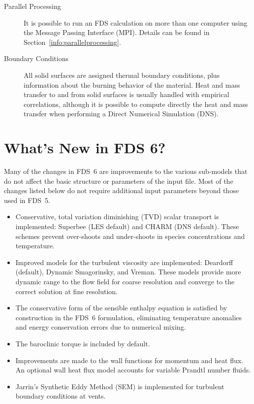 \documentclass[11pt]{book}
\begin{document}
\begin{description}
\item[Parallel Processing] It is possible to run an FDS calculation on
more than one computer using the Message Passing Interface (MPI). Details
can be found in Section~\ref{info:parallelprocessing}.

\item[Boundary Conditions]
All solid surfaces are assigned thermal boundary conditions, plus
information about the burning behavior of the material.
Heat and mass transfer to and from solid surfaces is
usually handled with empirical correlations, although it is possible
to compute directly the heat and mass transfer when performing a
Direct Numerical Simulation (DNS).

\end{description}


\section{What's New in FDS 6?}

Many of the changes in FDS~6 are improvements to the various sub-models that do not affect the basic structure or parameters of the input file. Most of the changes listed below do not require additional input parameters beyond those used in FDS~5.

\vspace{\baselineskip}


   \begin{itemize}
   \item Conservative, total variation diminishing (TVD) scalar transport is implemented: Superbee (LES default) and CHARM (DNS default). These schemes prevent over-shoots and under-shoots in species concentrations and temperature.
   \item Improved models for the turbulent viscosity are implemented: Deardorff (default), Dynamic Smagorinsky, and Vreman. These models provide more dynamic range to the flow field for coarse resolution and converge to the correct solution at fine resolution.
   \item The conservative form of the sensible enthalpy equation is satisfied by construction in the FDS~6 formulation, eliminating temperature anomalies and energy conservation errors due to numerical mixing.
   \item The baroclinic torque is included by default.
   \item Improvements are made to the wall functions for momentum and heat flux. An optional wall heat flux model accounts for variable Prandtl number fluids.
   \item Jarrin's Synthetic Eddy Method (SEM) is implemented for turbulent boundary conditions at vents.
   \end{itemize}
\end{document}
